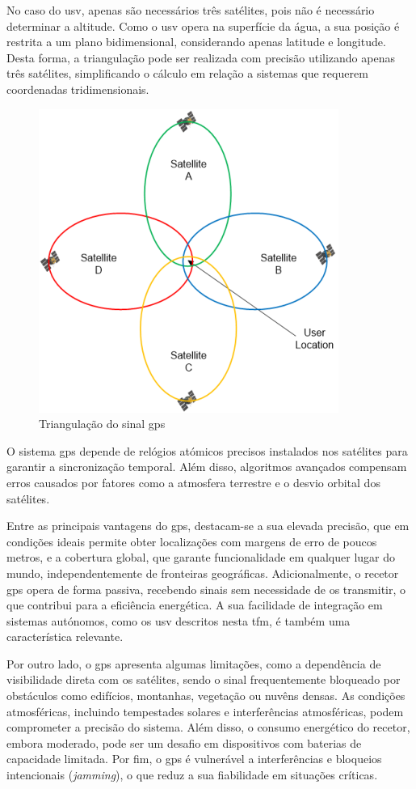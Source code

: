 No caso do \gls{usv}, apenas são necessários três satélites, pois não é necessário determinar a altitude. Como o \gls{usv} opera na superfície da água, a sua posição é restrita a um plano bidimensional, considerando apenas latitude e longitude. Desta forma, a triangulação pode ser realizada com precisão utilizando apenas três satélites, simplificando o cálculo em relação a sistemas que requerem coordenadas tridimensionais.

\begin{figure}[H]
    \centering
    \includegraphics[width=0.33\linewidth]{figuras/lowdop.png}
    \caption[Triangulação do sinal \gls{gps}]{Triangulação do sinal \gls{gps} \cite{help-gps}}
    \label{fig:triangulacao}
\end{figure}

O sistema \gls{gps} depende de relógios atómicos precisos instalados nos satélites para garantir a sincronização temporal. Além disso, algoritmos avançados compensam erros causados por fatores como a atmosfera terrestre e o desvio orbital dos satélites.

Entre as principais vantagens do \gls{gps}, destacam-se a sua elevada precisão, que em condições ideais permite obter localizações com margens de erro de poucos metros, e a cobertura global, que garante funcionalidade em qualquer lugar do mundo, independentemente de fronteiras geográficas. Adicionalmente, o recetor \gls{gps} opera de forma passiva, recebendo sinais sem necessidade de os transmitir, o que contribui para a eficiência energética. A sua facilidade de integração em sistemas autónomos, como os \gls{usv} descritos nesta \gls{tfm}, é também uma característica relevante.

Por outro lado, o \gls{gps} apresenta algumas limitações, como a dependência de visibilidade direta com os satélites, sendo o sinal frequentemente bloqueado por obstáculos como edifícios, montanhas, vegetação ou nuvêns densas. As condições atmosféricas, incluindo tempestades solares e interferências atmosféricas, podem comprometer a precisão do sistema. Além disso, o consumo energético do recetor, embora moderado, pode ser um desafio em dispositivos com baterias de capacidade limitada. Por fim, o \gls{gps} é vulnerável a interferências e bloqueios intencionais (\emph{jamming}), o que reduz a sua fiabilidade em situações críticas.

